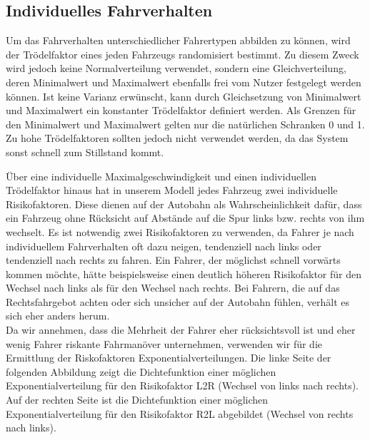 \documentclass[11pt, a4paper]{article}
\begin{document}
\subsection{Individuelles Fahrverhalten}

Um das Fahrverhalten unterschiedlicher Fahrertypen abbilden zu können, wird der Trödelfaktor eines jeden Fahrzeugs randomisiert bestimmt. Zu diesem Zweck wird jedoch keine Normalverteilung verwendet, sondern eine Gleichverteilung, deren Minimalwert und Maximalwert ebenfalls frei vom Nutzer festgelegt werden können. Ist keine Varianz erwünscht, kann durch Gleichsetzung von Minimalwert und Maximalwert ein konstanter Trödelfaktor definiert werden. Als Grenzen für den Minimalwert und Maximalwert gelten nur die natürlichen Schranken 0 und 1. Zu hohe Trödelfaktoren sollten jedoch nicht verwendet werden, da das System sonst schnell zum Stillstand kommt.

Über eine individuelle Maximalgeschwindigkeit und einen individuellen Trödelfaktor hinaus hat in unserem Modell jedes Fahrzeug zwei individuelle Risikofaktoren. Diese dienen auf der Autobahn als Wahrscheinlichkeit dafür, dass ein Fahrzeug ohne Rücksicht auf Abstände auf die Spur links bzw. rechts von ihm wechselt. Es ist notwendig zwei Risikofaktoren zu verwenden, da Fahrer je nach individuellem Fahrverhalten oft dazu neigen, tendenziell nach links oder tendenziell nach rechts zu fahren. Ein Fahrer, der möglichst schnell vorwärts kommen möchte, hätte beispielsweise einen deutlich höheren Risikofaktor für den Wechsel nach links als für den Wechsel nach rechts. Bei Fahrern, die auf das Rechtsfahrgebot achten oder sich unsicher auf der Autobahn fühlen, verhält es sich eher anders herum.\\
Da wir annehmen, dass die Mehrheit der Fahrer eher rücksichtsvoll ist und eher wenig Fahrer riskante Fahrmanöver unternehmen, verwenden wir für die Ermittlung der Riskofaktoren Exponentialverteilungen. Die linke Seite der folgenden Abbildung zeigt die Dichtefunktion einer möglichen Exponentialverteilung für den Risikofaktor L2R (Wechsel von links nach rechts). Auf der rechten Seite ist die Dichtefunktion einer möglichen Exponentialverteilung für den Risikofaktor R2L abgebildet (Wechsel von rechts nach links).
\end{document}
